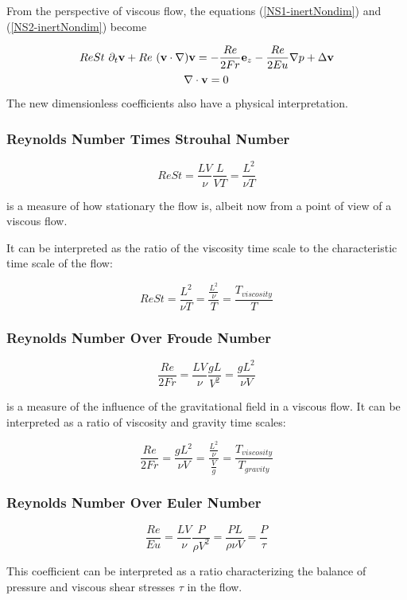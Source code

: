 From the perspective of viscous flow, the equations (\ref{NS1-inertNondim}) and (\ref{NS2-inertNondim}) become

\begin{equation} \label{NS1-viscNondim}
Re St~ \partial_t\mathbf{v} + Re ~(\mathbf{v} \cdot \nabla)\mathbf{v} = -\frac{Re}{2Fr} \mathbf{e}_z - \frac{Re}{2 Eu}\nabla p + \Delta\mathbf{v} 
\end{equation}
\begin{equation} \label{NS2-viscNondim}
\nabla\cdot\mathbf{v} = 0 
\end{equation}

The new dimensionless coefficients also have a physical interpretation.

\subsubsection{Reynolds Number Times Strouhal Number}

$$ ReSt = \frac{LV}{\nu} \frac{L}{VT} = \frac{L^2}{\nu T} $$

is a measure of how stationary the flow is, albeit now from a point of view of a viscous flow.

It can be interpreted as the ratio of the viscosity time scale to the characteristic time scale of the flow:

$$ ReSt = \frac{L^2}{\nu T} = \frac{\frac{L^2}{\nu}}{T} = \frac{T_{viscosity}}{T}$$

\subsubsection{Reynolds Number Over Froude Number}

$$ \frac{Re}{2Fr} = \frac{LV}{\nu}\frac{gL}{V^2} = \frac{gL^2}{\nu V} $$ 

is a measure of the influence of the gravitational field in a viscous flow. It can be interpreted as a ratio of viscosity and gravity time scales:

$$ \frac{Re}{2Fr} = \frac{gL^2}{\nu V} = \frac{\frac{L^2}{\nu}}{\frac{V}{g}} = \frac{T_{viscosity}}{T_{gravity}} $$ 

\subsubsection{Reynolds Number Over Euler Number}

$$ \frac{Re}{Eu} = \frac{LV}{\nu} \frac{P}{\rho V^2} = \frac{PL}{\rho\nu V}  = \frac{P}{\tau} $$

This coefficient can be interpreted as a ratio characterizing the balance of pressure and viscous shear stresses $\tau$ in the flow.

